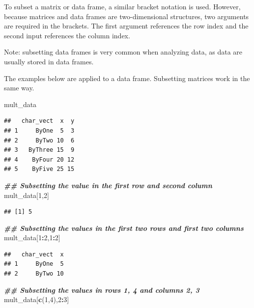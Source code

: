 \documentclass[
]{book}
\newenvironment{Shaded}{\begin{snugshade}}{\end{snugshade}}
\newcommand{\DecValTok}[1]{\textcolor[rgb]{0.00,0.00,0.81}{#1}}
\newcommand{\DocumentationTok}[1]{\textcolor[rgb]{0.56,0.35,0.01}{\textbf{\textit{#1}}}}
\newcommand{\FunctionTok}[1]{\textcolor[rgb]{0.13,0.29,0.53}{\textbf{#1}}}
\newcommand{\NormalTok}[1]{#1}
\newcommand{\SpecialCharTok}[1]{\textcolor[rgb]{0.81,0.36,0.00}{\textbf{#1}}}
\theoremstyle{definition}
\theoremstyle{definition}
\theoremstyle{definition}
\theoremstyle{definition}
\theoremstyle{remark}
\begin{document}
To subset a matrix or data frame, a similar bracket notation is used. However, because matrices and data frames are two-dimensional structures, two arguments are required in the brackets. The first argument references the row index and the second input references the column index.

Note: subsetting data frames is very common when analyzing data, as data are usually stored in data frames.

The examples below are applied to a data frame. Subsetting matrices work in the same way.

\begin{Shaded}
\begin{Highlighting}[]
\NormalTok{mult\_data}
\end{Highlighting}
\end{Shaded}

\begin{verbatim}
##   char_vect  x  y
## 1     ByOne  5  3
## 2     ByTwo 10  6
## 3   ByThree 15  9
## 4    ByFour 20 12
## 5    ByFive 25 15
\end{verbatim}

\begin{Shaded}
\begin{Highlighting}[]
\DocumentationTok{\#\# Subsetting the value in the first row and second column}
\NormalTok{mult\_data[}\DecValTok{1}\NormalTok{,}\DecValTok{2}\NormalTok{]}
\end{Highlighting}
\end{Shaded}

\begin{verbatim}
## [1] 5
\end{verbatim}

\begin{Shaded}
\begin{Highlighting}[]
\DocumentationTok{\#\# Subsetting the values in the first two rows and first two columns}
\NormalTok{mult\_data[}\DecValTok{1}\SpecialCharTok{:}\DecValTok{2}\NormalTok{,}\DecValTok{1}\SpecialCharTok{:}\DecValTok{2}\NormalTok{]}
\end{Highlighting}
\end{Shaded}

\begin{verbatim}
##   char_vect  x
## 1     ByOne  5
## 2     ByTwo 10
\end{verbatim}

\begin{Shaded}
\begin{Highlighting}[]
\DocumentationTok{\#\# Subsetting the values in rows 1, 4 and columns 2, 3}
\NormalTok{mult\_data[}\FunctionTok{c}\NormalTok{(}\DecValTok{1}\NormalTok{,}\DecValTok{4}\NormalTok{),}\DecValTok{2}\SpecialCharTok{:}\DecValTok{3}\NormalTok{]}
\end{Highlighting}
\end{Shaded}
\end{document}
